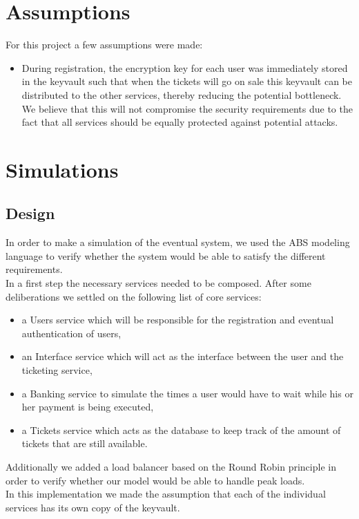 \documentclass[conference]{IEEEtran}
\begin{document}
\section{Assumptions}
For this project a few assumptions were made:
\begin{itemize}
	\item During registration, the encryption key for each user was immediately stored in the keyvault such that when the tickets will go on sale this keyvault can be distributed to the other services, thereby reducing the potential bottleneck.\\
	We believe that this will not compromise the security requirements due to the fact that all services should be equally protected against potential attacks.
\end{itemize}

\section{Simulations}
\label{simulation}
\subsection{Design}
In order to make a simulation of the eventual system, we used the ABS modeling language to verify whether the system would be able to satisfy the different requirements.\\
In a first step the necessary services needed to be composed. After some deliberations we settled on the following list of core services:
\begin{itemize}
	\item a Users service which will be responsible for the registration and eventual authentication of users,
	\item an Interface service which will act as the interface between the user and the ticketing service,
	\item a Banking service to simulate the times a user would have to wait while his or her payment is being executed,
	\item a Tickets service which acts as the database to keep track of the amount of tickets that are still available.
\end{itemize}
Additionally we added a load balancer based on the Round Robin principle in order to verify whether our model would be able to handle peak loads.\\
In this implementation we made the assumption that each of the individual services has its own copy of the keyvault.
\end{document}
